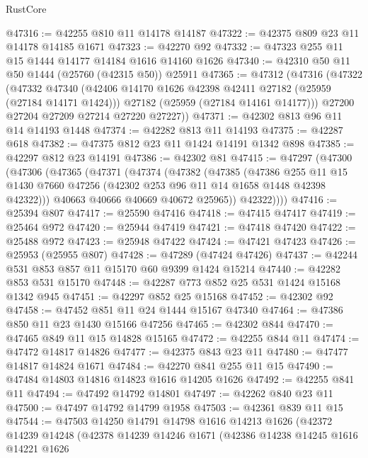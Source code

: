 \begin{lexlean}{RustCore}
\begin{coremodule}
@47316 := @42255 @810 @11 @14178 @14187
@47322 := @42375 @809 @23 @11 @14178 @14185 @1671
@47323 := @42270 @92
@47332 := @47323 @255 @11 @15 @1444 @14177 @14184 @1616 @14160 @1626
@47340 := @42310 @50 @11 @50 @1444 (@25760 (@42315 @50)) @25911
@47365 := @47312
    (@47316
      (@47322
        (@47332
          @47340
          (@42406 @14170 @1626 @42398 @42411 @27182 (@25959 (@27184 @14171 @1424)))
          @27182
          (@25959 (@27184 @14161 @14177)))
        @27200
        @27204
        @27209
        @27214
        @27220
        @27227))
@47371 := @42302 @813 @96 @11 @14 @14193 @1448
@47374 := @42282 @813 @11 @14193
@47375 := @42287 @618
@47382 := @47375 @812 @23 @11 @1424 @14191 @1342 @898
@47385 := @42297 @812 @23 @14191
@47386 := @42302 @81
@47415 := @47297
    (@47300
      (@47306
        (@47365
          (@47371
            (@47374
              (@47382
                (@47385
                  (@47386
                    @255
                    @11
                    @15
                    @1430
                    @7660
                    @47256
                    (@42302 @253 @96 @11 @14 @1658 @1448 @42398 @42322)))
                @40663
                @40666
                @40669
                @40672
                @25965))
            @42322))))
@47416 := @25394 @807
@47417 := @25590 @47416
@47418 := @47415 @47417
@47419 := @25464 @972
@47420 := @25944 @47419
@47421 := @47418 @47420
@47422 := @25488 @972
@47423 := @25948 @47422
@47424 := @47421 @47423
@47426 := @25953 (@25955 @807)
@47428 := @47289 (@47424 @47426)
@47437 := @42244 @531 @853 @857 @11 @15170 @60 @9399 @1424 @15214
@47440 := @42282 @853 @531 @15170
@47448 := @42287 @773 @852 @25 @531 @1424 @15168 @1342 @945
@47451 := @42297 @852 @25 @15168
@47452 := @42302 @92
@47458 := @47452 @851 @11 @24 @1444 @15167 @47340
@47464 := @47386 @850 @11 @23 @1430 @15166 @47256
@47465 := @42302 @844
@47470 := @47465 @849 @11 @15 @14828 @15165
@47472 := @42255 @844 @11
@47474 := @47472 @14817 @14826
@47477 := @42375 @843 @23 @11
@47480 := @47477 @14817 @14824 @1671
@47484 := @42270 @841 @255 @11 @15
@47490 := @47484 @14803 @14816 @14823 @1616 @14205 @1626
@47492 := @42255 @841 @11
@47494 := @47492 @14792 @14801
@47497 := @42262 @840 @23 @11
@47500 := @47497 @14792 @14799 @1958
@47503 := @42361 @839 @11 @15
@47544 := @47503
    @14250
    @14791
    @14798
    @1616
    @14213
    @1626
    (@42372
      @14239
      @14248
      (@42378
        @14239
        @14246
        @1671
        (@42386
          @14238
          @14245
          @1616
          @14221
          @1626

\end{coremodule}
\end{lexlean}
